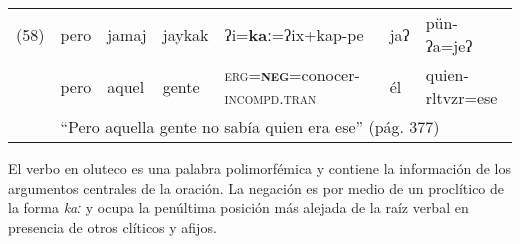 {%
{\small
\noindent \begin{tabular}{lllllll}
(58) & pero & jamaj & jaykak & ʔi=\textbf{kaː}=ʔix+kap-pe & jaʔ & pün-ʔa=jeʔ \\
& pero & aquel & gente & \textsc{erg=\textbf{neg}=}conocer-\textsc{incompd.tran} & él & quien-rltvzr=ese \\
& \multicolumn{6}{l}{``Pero aquella gente no sabía quien era ese'' (pág. 377)}
\end{tabular} \vspace{0.3cm}
}

}

El verbo en oluteco es una palabra polimorfémica \textcolor{MidnightBlue}{\citep{Oluteco}} y contiene la información de los argumentos centrales de la oración. La negación es por medio de un proclítico de la forma {\setmainfont{Charis SIL} \textit{kaː}} y ocupa la penúltima posición más alejada de la raíz verbal en presencia de otros clíticos y afijos.